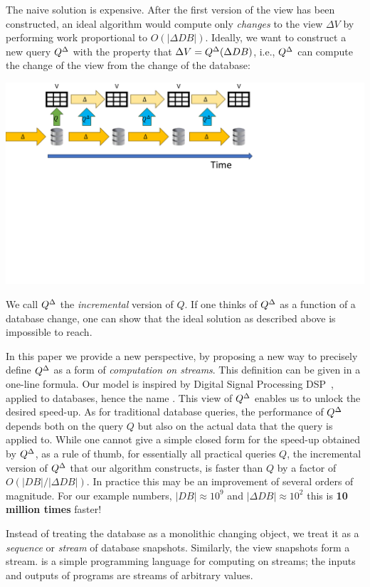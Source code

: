 The naive solution is expensive.  After the first version of the view
has been constructed, an ideal algorithm would compute only
\emph{changes} to the view $\Delta V$ by performing work proportional
to $O(|\Delta DB|)$.  Ideally, we want to construct a new query
${Q}^{\Delta}$ with the property that $\Delta V = {Q}^{\Delta}(\Delta DB)$,
i.e., ${Q}^{\Delta}$ can compute the change of the view from the change of
the database:

\includegraphics[trim={0 4in 4in 0},clip,scale=.3]{incview.pdf}

We call ${Q}^{\Delta}$ the \emph{incremental} version of $Q$.  If one
thinks of ${Q}^{\Delta}$ as a function of a database change, one can show
that the ideal solution as described above is impossible to reach.

In this paper we provide a new perspective, by proposing a new way to
precisely define ${Q}^{\Delta}$ as a form of \emph{computation on streams}.
This definition can be given in a one-line formula.  Our model is
inspired by Digital Signal Processing DSP~\cite{rabiner-book75},
applied to databases, hence the name \dbsp.  This view of ${Q}^{\Delta}$
enables us to unlock the desired speed-up.  As for traditional
database queries, the performance of ${Q}^{\Delta}$ depends both on the
query $Q$ but also on the actual data that the query is applied to.
While one cannot give a simple closed form for the speed-up obtained
by ${Q}^{\Delta}$, as a rule of thumb, for essentially all practical
queries $Q$, the incremental version of ${Q}^{\Delta}$ that our algorithm
constructs, is faster than $Q$ by a factor of $O(|DB| / |\Delta DB|)$.
In practice this may be an improvement of several orders of magnitude.
For our example numbers, $|DB| \approx 10^9$ and $|\Delta DB| \approx
10^2$ this is \textbf{10 million times} faster!

Instead of treating the database as a monolithic changing object, we
treat it as a \emph{sequence} or \emph{stream} of database snapshots.
Similarly, the view snapshots form a stream.  \dbsp is a simple
programming language for computing on streams; the inputs and outputs
of \dbsp programs are streams of arbitrary values.

